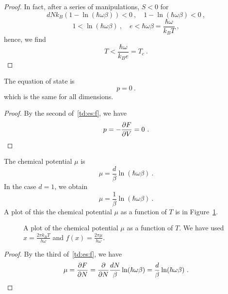     \begin{proof}
        In fact, after a series of manipulations, $S < 0$ for 
        \begin{equation*}
            d N k_B (1 - \ln (\hbar \omega \beta)) < 0 ~, \quad 1 - \ln (\hbar \omega \beta) < 0 ~,
        \end{equation*}
        \begin{equation*}
            1 < \ln (\hbar \omega \beta) ~, \quad e < \hbar \omega \beta = \frac{\hbar \omega}{k_B T}  ~,
        \end{equation*}
        hence, we find
        \begin{equation*}
            T < \frac{\hbar \omega}{k_B e} = T_c ~.
        \end{equation*}
    \end{proof}
    The equation of state is 
    \begin{equation}\label{idesharm}
        p = 0 ~.
    \end{equation}
    which is the same for all dimensions.
    \begin{proof}
        By the second of~\eqref{td:es:f}, we have
        \begin{equation*}
            p = - \frac{\partial F}{\partial V} = 0 ~.
        \end{equation*}
    \end{proof}
    The chemical potential $\mu$ is 
    \begin{equation*}
        \mu = \frac{d}{\beta} \ln (\hbar \omega \beta) ~.
    \end{equation*}
    In the case $d=1$, we obtain
    \begin{equation*}
        \mu = \frac{1}{\beta} \ln (\hbar \omega \beta) ~.
    \end{equation*}
    A plot of this the chemical potential $\mu$ as a function of $T$ is in Figure~\ref{fig:c:mu2}.
    \begin{figure}
        \centering
        \caption{A plot of the chemical potential $\mu$ as a function of $T$. We have used $x = \frac{2 \pi k_B T}{h \omega}$ and $f(x) = \frac{2 \pi \mu}{h \omega}$.}
        \label{fig:c:mu2}
    \end{figure}
    \begin{proof}
        By the third of~\eqref{td:es:f}, we have
        \begin{equation*}
            \mu = \frac{\partial F}{\partial N} = \frac{\partial}{\partial N} \frac{dN}{\beta} \ln (\hbar \omega \beta) = \frac{d}{\beta} \ln (\hbar \omega \beta) ~.
        \end{equation*}
    \end{proof}
